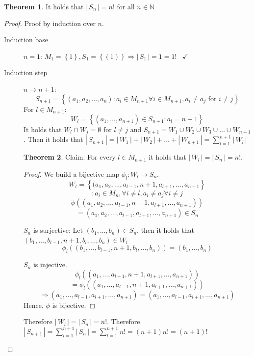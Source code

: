 \documentclass[a4paper,landscape,twocolumn]{article}
\theoremstyle{definition}
\newtheorem{theorem}{Theorem}
\newcommand\set[1]{\left\{#1\right\}}
\newcommand\card[1]{\left|\,#1\,\right|}
\newcommand\done{\hspace{10pt}\checkmark}
\begin{document}
\begin{theorem}
  It holds that $\card{S_n} = n!$ for all $n \in \mathbb{N}$
\end{theorem}
\begin{proof}
  Proof by induction over $n$.
  \begin{description}
    \item[Induction base]
      $n=1$:
        $M_1 = \set{1}, S_1 = \set{(1)} \Rightarrow \card{S_1} = 1 = 1! \done$
    \item[Induction step]
      $n\rightarrow n+1$:
        \[
          S_{n+1} = \set{(a_1, a_2, \ldots, a_n) :
              a_i \in M_{n+1} \forall i \in M_{n+1},
              a_i \neq a_j \text{ for } i \neq j}
        \]
        For $l \in M_{n+1}$: \[
          W_l = \set{(a_1, \ldots, a_{n+1}) \in S_{n+1}: a_l = n+1}
        \]
        It holds that $W_l \cap W_j = \emptyset$ for $l \neq j$
        and $S_{n+1} = W_1 \cup W_2 \cup W_3 \cup \ldots \cup W_{n+1}$.
        Then it holds that $\card{S_{n+1}} = \card{W_1} + \card{W_2} + \ldots + \card{W_{n+1}} = \sum_{l=1}^{n+1} \card{W_l}$

        \begin{theorem}
          Claim: For every $l \in M_{n+1}$ it holds that $\card{W_l} = \card{S_n} = n!$.
        \end{theorem}
        \begin{proof}
          We build a bijective map $\phi_l: W_l \rightarrow S_n$.
          \[
              W_l = \set{(a_1, a_2, \ldots, a_{l-1}, n+1, a_{l+1}, \ldots, a_{n+1}}
          \]\[
                  :a_i \in M_n, \forall i \neq l, a_i \neq a_j \forall i \neq j
          \] \[
              \phi\left((a_1, a_2, \ldots, a_{l-1}, n+1, a_{l+1}, \ldots, a_{n+1})\right)
          \] \[
                  = (a_1, a_2, \ldots, a_{l-1}, a_{l+1}, \ldots, a_{n+1}) \in S_n
          \]

          $S_n$ is surjective:
          Let $(b_1, \ldots, b_n) \in S_n$, then it holds that $(b_1, \ldots, b_{l-1}, n+1, b_l, \ldots, b_n) \in W_l$
          \[ \phi_l((b_1, \ldots, b_{l-1}, n+1, b_l, \ldots, b_n)) = (b_1, \ldots, b_n) \]

          $S_n$ is injective.
          \[
              \phi_l((a_1, \ldots, a_{l-1}, n+1, a_{l+1}, \ldots, a_{n+1}))
          \] \[
                  = \phi_l((a_1, \ldots, a_{l-1}, n+1, a_{l+1}, \dots, a_{n+1}))
          \] \[
               \Rightarrow
               (a_1, \ldots, a_{l-1}, a_{l+1}, \ldots, a_{n+1}) =
               (a_1, \ldots, a_{l-1}, a_{l+1}, \ldots, a_{n+1})
          \]
          Hence, $\phi$ is bijective.
        \end{proof}

        Therefore $\card{W_l} = \card{S_n} = n!$.
        Therefore $\card{S_{n+1}} = \sum_{l=1}^{n+1} \card{S_n} = \sum_{l=1}^{n+1} n! = (n + 1) n! = (n + 1)!$
  \end{description}
\end{proof}
\end{document}
